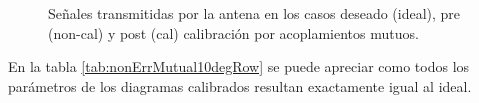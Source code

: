 \begin{figure}[H]
	\centering

	\caption{Señales transmitidas por la antena en los casos deseado (ideal), pre (non-cal) y post (cal) calibración por acoplamientos mutuos.}
	\label{fig:nonErrMutual10degRow}
\end{figure}

En la tabla \ref{tab:nonErrMutual10degRow} se puede apreciar como todos los parámetros de los diagramas calibrados resultan 
exactamente igual al ideal.

